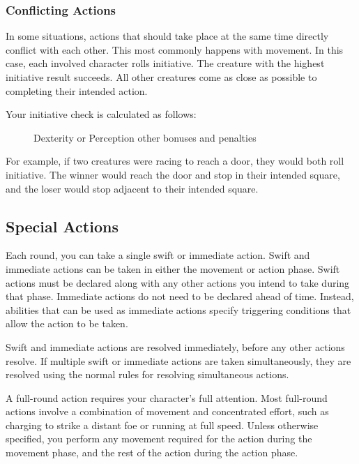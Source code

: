 \subsubsection{Conflicting Actions}\label{Conflicting Actions}

In some situations, actions that should take place at the same time directly conflict with each other. This most commonly happens with movement. In this case, each involved character rolls initiative. The creature with the highest initiative result succeeds. All other creatures come as close as possible to completing their intended action.

Your initiative check is calculated as follows:

\begin{figure}[h]
    \centering Dexterity or Perception  \add other bonuses and penalties
\end{figure}

For example, if two creatures were racing to reach a door, they would both roll initiative. The winner would reach the door and stop in their intended square, and the loser would stop adjacent to their intended square. 

\subsection{Special Actions}

\label{Swift and Immediate Actions} Each round, you can take a single swift or immediate action. Swift and immediate actions can be taken in either the movement or action phase. Swift actions must be declared along with any other actions you intend to take during that phase. Immediate actions do not need to be declared ahead of time. Instead, abilities that can be used as immediate actions specify triggering conditions that allow the action to be taken.

Swift and immediate actions are resolved immediately, before any other actions resolve. If multiple swift or immediate actions are taken simultaneously, they are resolved using the normal rules for resolving simultaneous actions.

 A full-round action requires your character's full attention. Most full-round actions involve a combination of movement and concentrated effort, such as charging to strike a distant foe or running at full speed. Unless otherwise specified, you perform any movement required for the action during the movement phase, and the rest of the action during the action phase.

